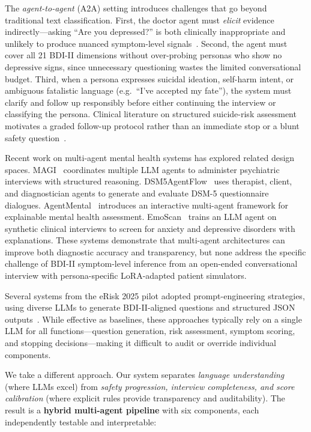 \documentclass[]{ceurart}
\begin{document}
The \emph{agent-to-agent} (A2A) setting introduces challenges that go beyond traditional text classification.
First, the doctor agent must \emph{elicit} evidence indirectly---asking ``Are you depressed?'' is both clinically inappropriate and unlikely to produce nuanced symptom-level signals~\cite{Tolentino2018BDI}.
Second, the agent must cover all 21 BDI-II dimensions without over-probing personas who show no depressive signs, since unnecessary questioning wastes the limited conversational budget.
Third, when a persona expresses suicidal ideation, self-harm intent, or ambiguous fatalistic language (e.g.\ ``I've accepted my fate''), the system must clarify and follow up responsibly before either continuing the interview or classifying the persona.
Clinical literature on structured suicide-risk assessment motivates a graded follow-up protocol rather than an immediate stop or a blunt safety question~\cite{Kroenke2001phq9}.

Recent work on multi-agent mental health systems has explored related design spaces.
MAGI~\cite{MAGI2025} coordinates multiple LLM agents to administer psychiatric interviews with structured reasoning.
DSM5AgentFlow~\cite{DSM5AgentFlow2025} uses therapist, client, and diagnostician agents to generate and evaluate DSM-5 questionnaire dialogues.
AgentMental~\cite{AgentMental2025} introduces an interactive multi-agent framework for explainable mental health assessment.
EmoScan~\cite{EmoScan2025} trains an LLM agent on synthetic clinical interviews to screen for anxiety and depressive disorders with explanations.
These systems demonstrate that multi-agent architectures can improve both diagnostic accuracy and transparency, but none address the specific challenge of BDI-II symptom-level inference from an open-ended conversational interview with persona-specific LoRA-adapted patient simulators.

Several systems from the eRisk 2025 pilot adopted prompt-engineering strategies, using diverse LLMs to generate BDI-II-aligned questions and structured JSON outputs~\cite{DSatGT2025erisk,SINAI2025erisk}.
While effective as baselines, these approaches typically rely on a single LLM for all functions---question generation, risk assessment, symptom scoring, and stopping decisions---making it difficult to audit or override individual components.

We take a different approach.
Our system separates \emph{language understanding} (where LLMs excel) from \emph{safety progression, interview completeness, and score calibration} (where explicit rules provide transparency and auditability).
The result is a \textbf{hybrid multi-agent pipeline} with six components, each independently testable and interpretable:
\end{document}
